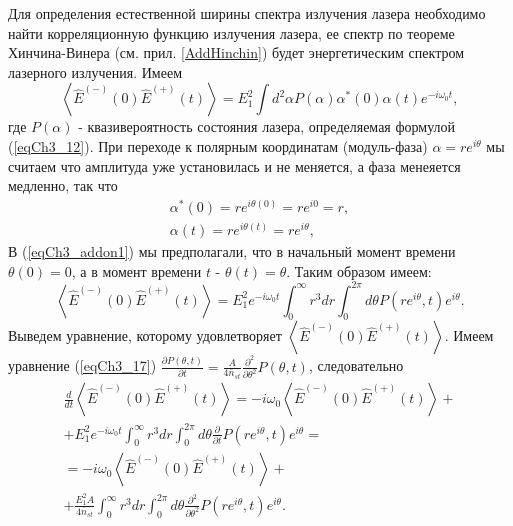 Для определения естественной ширины спектра излучения лазера
необходимо найти корреляционную функцию излучения лазера, ее спектр по
теореме Хинчина-Винера (см. прил. \ref{AddHinchin}) будет
энергетическим спектром лазерного излучения. Имеем
\begin{equation}
\left<\hat{E}^{(-)}\left(0\right)\hat{E}^{(+)}\left(t\right)\right>
= E_1^2\int d^2\alpha P\left(\alpha\right) \alpha^{*}\left(0\right)\alpha\left(t\right) e^{-i
  \omega_0 t},
\nonumber
\end{equation}
где $P\left(\alpha\right)$ - квазивероятность состояния лазера,
определяемая формулой (\ref{eqCh3_12}). 
При переходе к полярным координатам
(модуль-фаза) $\alpha = r e^{i \theta}$
мы считаем что амплитуда уже
установилась и не меняется, а фаза менеяется медленно, так что 
\begin{eqnarray}
\alpha^{*}\left(0\right) = r e^{i\theta\left(0\right)} = r e^{i 0} = r,
\nonumber \\
\alpha\left(t\right) = r e^{i\theta\left(t\right)} = r e^{i \theta},
\label{eqCh3_addon1}
\end{eqnarray}
В (\ref{eqCh3_addon1}) мы предполагали, что в начальный момент времени 
$\theta\left(0\right) = 0$, а в момент времени $t$ - $\theta\left(t\right) = \theta$.
Таким образом имеем:
\begin{equation}
\left<\hat{E}^{(-)}\left(0\right)\hat{E}^{(+)}\left(t\right)\right>
= E_1^2 e^{-i
  \omega_0 t}\int_0^{\infty}r^3 d r \int_0^{2 \pi}d \theta P\left(r
e^{i \theta}, t\right) e^{i \theta}.
\nonumber
\end{equation}
Выведем уравнение, которому удовлетворяет 
$\left<\hat{E}^{(-)}\left(0\right)\hat{E}^{(+)}\left(t\right)\right>$. 
Имеем уравнение (\ref{eqCh3_17}) 
\(
\frac{\partial P \left(\theta, t\right)}{\partial t} = 
\frac{A}{4 \bar{n}_{st}}
\frac{\partial^2}{\partial \theta^2}
P \left(\theta, t\right)
\),
следовательно
\begin{eqnarray}
\frac{d}{dt}\left<\hat{E}^{(-)}\left(0\right)\hat{E}^{(+)}\left(t\right)\right>
= -i \omega_0
\left<\hat{E}^{(-)}\left(0\right)\hat{E}^{(+)}\left(t\right)\right>+
\nonumber \\
+ E_1^2 e^{-i
  \omega_0 t}\int_0^{\infty}r^3 d r \int_0^{2 \pi}d \theta
\frac{\partial}{\partial t}P\left(r
e^{i \theta}, t\right) e^{i \theta}
=
\nonumber \\
=
-i \omega_0
\left<\hat{E}^{(-)}\left(0\right)\hat{E}^{(+)}\left(t\right)\right>+
\nonumber \\ 
+
\frac{E_1^2 A}{4 \bar{n}_{st}} 
\int_0^{\infty}r^3 d r 
\int_0^{2 \pi}
d \theta
\frac{\partial^2}{\partial \theta^2}P\left(r
e^{i \theta}, t\right) e^{i \theta}.
\label{eqPart2Ch1_add84_1}
\end{eqnarray}
